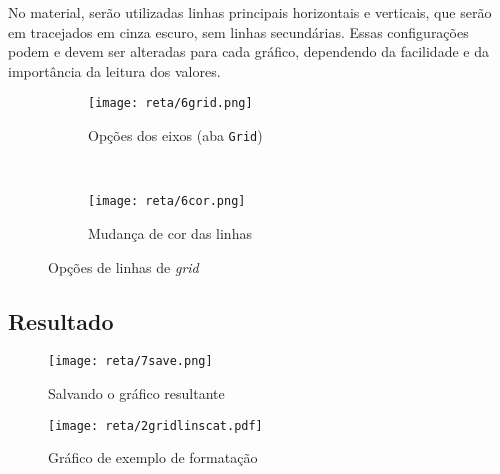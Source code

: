     No material, serão utilizadas linhas principais horizontais e verticais, que serão em tracejados em cinza escuro, sem linhas secundárias. Essas configurações podem e devem ser alteradas para cada gráfico, dependendo da facilidade e da importância da leitura dos valores.

    \begin{figure}[htbp]
        \centering
        \begin{subfigure}{0.45\textwidth}
            \centering
            \texttt{[image: reta/6grid.png]}

            \caption{Opções dos eixos (aba \texttt{Grid})}
            \label{fig:reta:grid}
        \end{subfigure}
        ~
        \begin{subfigure}{0.45\textwidth}
            \centering
            \texttt{[image: reta/6cor.png]}

            \caption{Mudança de cor das linhas}
            \label{fig:reta:gridcor}
        \end{subfigure}
        \caption{Opções de linhas de \textit{grid}}
        \label{fig:reta:opcoes_eixo}
    \end{figure}


\subsection{Resultado}

    \begin{figure}[htbp]
        \centering
        \texttt{[image: reta/7save.png]}

        \caption{Salvando o gráfico resultante}
        \label{fig:reta:salvar}
    \end{figure}

    \begin{figure}[H]
        \centering
        \texttt{[image: reta/2gridlinscat.pdf]}

        \caption{Gráfico de exemplo de formatação}
        \label{fig:reta:gridlinscat}
    \end{figure}

